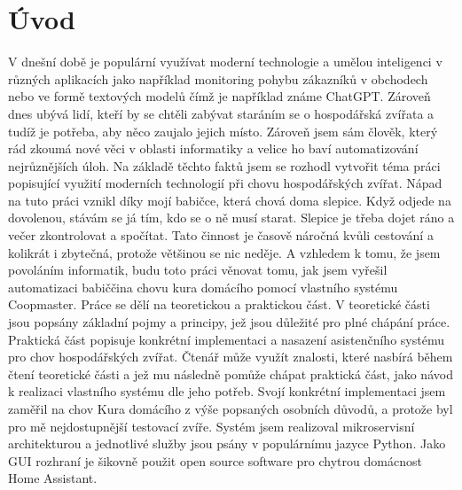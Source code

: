 \chapter{Úvod}\label{ch:uvod}
V dnešní době je populární využívat moderní technologie a umělou inteligenci v různých aplikacích jako například monitoring pohybu zákazníků v obchodech nebo ve formě textových modelů čímž je například známe ChatGPT.
Zároveň dnes ubývá lidí, kteří by se chtěli zabývat staráním se o hospodářská zvířata a tudíž je potřeba, aby něco zaujalo jejich místo.
Zároveň jsem sám člověk, který rád zkoumá nové věci v oblasti informatiky a velice ho baví automatizování nejrůznějších úloh.
Na základě těchto faktů jsem se rozhodl vytvořit téma práci popisující využití moderních technologií při chovu hospodářských zvířat.
Nápad na tuto práci vznikl díky mojí babičce, která chová doma slepice.
Když odjede na dovolenou, stávám se já tím, kdo se o ně musí starat.
Slepice je třeba dojet ráno a večer zkontrolovat a spočítat.
Tato činnost je časově náročná kvůli cestování a kolikrát i zbytečná, protože většinou se nic neděje.
A vzhledem k tomu, že jsem povoláním informatik, budu toto práci věnovat tomu, jak jsem vyřešil automatizaci babiččina chovu kura domácího pomocí vlastního systému Coopmaster.
\newline
Práce se dělí na teoretickou a praktickou část.
V teoretické části jsou popsány základní pojmy a principy, jež jsou důležité pro plné chápání práce.
Praktická část popisuje konkrétní implementaci a nasazení asistenčního systému pro chov hospodářských zvířat.
Čtenář může využít znalosti, které nasbírá během čtení teoretické části a jež mu následně pomůže chápat praktická část, jako návod k realizaci vlastního systému dle jeho potřeb.
\newline
Svojí konkrétní implementaci jsem zaměřil na chov Kura domácího z výše popsaných osobních důvodů, a protože byl pro mě nejdostupnější testovací zvíře.
Systém jsem realizoval mikroservisní architekturou a jednotlivé služby jsou psány v populárnímu jazyce Python.
Jako GUI rozhraní je šikovně použit open source software pro chytrou domácnost Home Assistant.